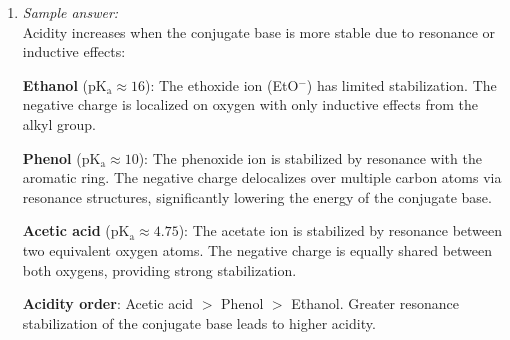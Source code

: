 \documentclass[11pt]{article}
\begin{document}
\begin{enumerate}[label=\textbf{\arabic*.}]
  \textbf{Example - Sulfonation of naphthalene}:
  \begin{itemize}
    \item At $80^\circ$C: 1-naphthalenesulfonic acid forms faster (kinetic product, less hindered position)
    \item At $160^\circ$C: 2-naphthalenesulfonic acid predominates (thermodynamic product, more stable 
    due to less steric strain)
    \item The reaction is reversible, allowing equilibration to the more stable isomer at higher temperature
  \end{itemize}

  \item \emph{Sample answer:}\\
  Acidity increases when the conjugate base is more stable due to resonance or inductive effects:

  \textbf{Ethanol} ($\mathrm{pK_a} \approx 16$): The ethoxide ion (EtO$^-$) has limited stabilization. 
  The negative charge is localized on oxygen with only inductive effects from the alkyl group.

  \textbf{Phenol} ($\mathrm{pK_a} \approx 10$): The phenoxide ion is stabilized by resonance with 
  the aromatic ring. The negative charge delocalizes over multiple carbon atoms via resonance structures, 
  significantly lowering the energy of the conjugate base.

  \textbf{Acetic acid} ($\mathrm{pK_a} \approx 4.75$): The acetate ion is stabilized by resonance 
  between two equivalent oxygen atoms. The negative charge is equally shared between both oxygens, 
  providing strong stabilization.

  \textbf{Acidity order}: Acetic acid $>$ Phenol $>$ Ethanol. Greater resonance stabilization of 
  the conjugate base leads to higher acidity.

\end{enumerate}
\end{document}
